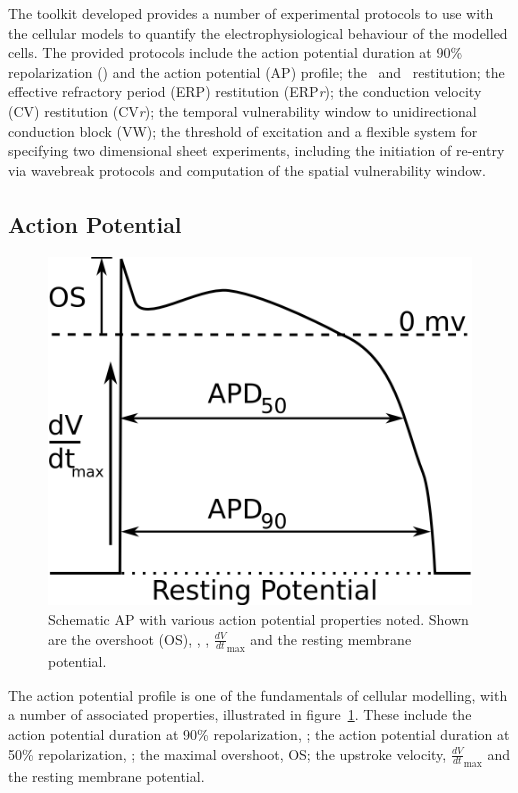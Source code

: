 The toolkit developed provides a number of experimental protocols to use with
the cellular models to quantify the electrophysiological behaviour of the
modelled cells.  The provided protocols include the action potential duration at
90\% repolarization (\apd) and the action potential (AP) profile; the \apdr\ and
\apdr[50]\ restitution; the effective refractory period (ERP) restitution
(ERP\emph{r}); the conduction velocity (CV) restitution (CV\emph{r}); the
temporal vulnerability window to unidirectional conduction block (VW); the
threshold of excitation and a flexible system for specifying two dimensional
sheet experiments, including the initiation of re-entry via wavebreak protocols
and computation of the spatial vulnerability window.

\subsection{Action Potential}

\begin{figure}
\centering
\includegraphics{figures/toolkit/illustrations/labelled_ap_profile}
\caption[Illustration of AP properties]{
\label{fig:toolkit:illus:ap}
Schematic AP with various action potential properties noted.
Shown are the overshoot (OS), \apd, \apd[50], $\frac{dV}{dt}_{\text{max}}$ and
the resting membrane potential.
}
\end{figure}

The action potential profile is one of the fundamentals of cellular modelling,
with a number of associated properties, illustrated in
figure~\ref{fig:toolkit:illus:ap}.  These include the action potential
duration at 90\% repolarization, \apd; the action potential
duration at 50\% repolarization, \apd[50]; the maximal overshoot, OS; the
upstroke velocity, $\frac{dV}{dt}_{\text{max}}$ and the resting membrane
potential.

